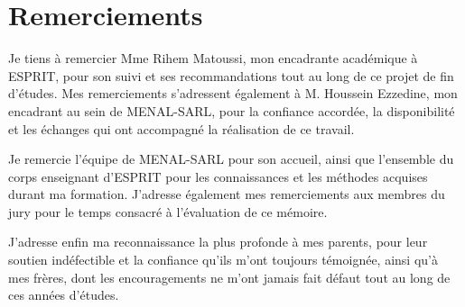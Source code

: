 \chapter*{Remerciements}
\thispagestyle{plain}

Je tiens à remercier Mme Rihem Matoussi, mon encadrante académique à ESPRIT, pour son suivi et
ses recommandations tout au long de ce projet de fin d'études. Mes remerciements s'adressent
également à M. Houssein Ezzedine, mon encadrant au sein de MENAL-SARL, pour la confiance
accordée, la disponibilité et les échanges qui ont accompagné la réalisation de ce travail.

Je remercie l'équipe de MENAL-SARL pour son accueil, ainsi que l'ensemble du corps enseignant
d'ESPRIT pour les connaissances et les méthodes acquises durant ma formation. J'adresse
également mes remerciements aux membres du jury pour le temps consacré à l'évaluation de ce
mémoire.

J'adresse enfin ma reconnaissance la plus profonde à mes parents, pour leur soutien indéfectible
et la confiance qu'ils m'ont toujours témoignée, ainsi qu'à mes frères, dont les encouragements
ne m'ont jamais fait défaut tout au long de ces années d'études.
